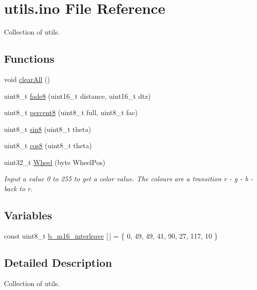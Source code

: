 \hypertarget{utils_8ino}{}\section{utils.\+ino File Reference}
\label{utils_8ino}


Collection of utils.  


\subsection*{Functions}
\begin{DoxyCompactItemize}
\item 
void \hyperlink{utils_8ino_a798729dca95209ecdc609807a653a2bf}{clear\+All} ()
\item 
uint8\+\_\+t \hyperlink{utils_8ino_ab5a87ca857f392dbad3bf3a4582c3f0e}{fade8} (uint16\+\_\+t distance, uint16\+\_\+t dtz)
\item 
uint8\+\_\+t \hyperlink{utils_8ino_ae7f706e9934c4154b7a4e222f14c8c9a}{percent8} (uint8\+\_\+t full, uint8\+\_\+t fac)
\item 
uint8\+\_\+t \hyperlink{group___fast_l_e_d_ga538b510f61cc75c8e4491f9f2797ee7c}{sin8} (uint8\+\_\+t theta)
\item 
uint8\+\_\+t \hyperlink{group___fast_l_e_d_ga007b62e82ea1556ea7b0e3d2656bce09}{cos8} (uint8\+\_\+t theta)
\item 
uint32\+\_\+t \hyperlink{group___adafruit_ga953424274959481c9d46b57d249b3722}{Wheel} (byte Wheel\+Pos)
\begin{DoxyCompactList}\small\item\em Input a value 0 to 255 to get a color value. The colours are a transition r -\/ g -\/ b -\/ back to r. \end{DoxyCompactList}\end{DoxyCompactItemize}
\subsection*{Variables}
\begin{DoxyCompactItemize}
\item 
const uint8\+\_\+t \hyperlink{group___fast_l_e_d_gadc654138105ff193df0fbc7a0c21806c}{b\+\_\+m16\+\_\+interleave} \mbox{[}$\,$\mbox{]} = \{ 0, 49, 49, 41, 90, 27, 117, 10 \}
\end{DoxyCompactItemize}


\subsection{Detailed Description}
Collection of utils. 

